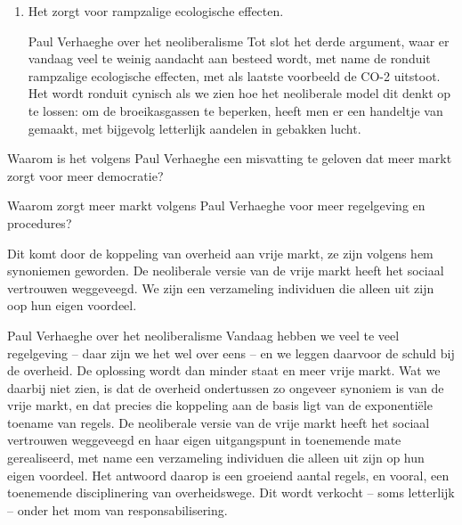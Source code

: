 \documentclass[main.tex]{subfiles}
\begin{document}
\begin{examenvraag}
\begin{antwoord}
\begin{enumerate}
		\item Het zorgt voor rampzalige ecologische effecten.
		\begin{citaat}{Paul Verhaeghe over het neoliberalisme}
		Tot slot het derde argument, waar er vandaag veel te weinig aandacht aan besteed wordt, met
name de ronduit rampzalige ecologische effecten, met als laatste voorbeeld de CO-2 uitstoot. Het
wordt ronduit cynisch als we zien hoe het neoliberale model dit denkt op te lossen: om de
broeikasgassen te beperken, heeft men er een handeltje van gemaakt, met bijgevolg letterlijk aandelen
in gebakken lucht.
		\end{citaat}
    \end{enumerate}
    \end{antwoord}
\end{examenvraag}


\begin{examenvraag}
    \begin{vraag}
        Waarom is het volgens Paul Verhaeghe een misvatting te geloven dat meer markt zorgt voor meer democratie?
    \end{vraag}

    \begin{antwoord}
    \end{antwoord}
\end{examenvraag}


\begin{examenvraag}

    \begin{vraag}
        Waarom zorgt meer markt volgens Paul Verhaeghe voor meer regelgeving en procedures?
    \end{vraag}

    \begin{antwoord}
    Dit komt door de koppeling van overheid aan vrije markt, ze zijn volgens hem 
    synoniemen geworden. De neoliberale versie van de vrije markt heeft het 
    sociaal vertrouwen weggeveegd. We zijn een verzameling individuen die alleen 
    uit zijn oop hun eigen voordeel.
    \end{antwoord}
    
    \begin{citaat}{Paul Verhaeghe over het neoliberalisme}
	Vandaag hebben we veel te veel regelgeving – daar zijn we het wel
	over eens – en we leggen daarvoor de schuld bij de overheid. De oplossing 
	wordt dan minder staat en meer vrije markt. Wat we daarbij niet zien, is dat 	
	de overheid ondertussen zo ongeveer synoniem is van de vrije markt, en dat 
	precies die koppeling aan de basis ligt van de exponentiële toename van
	regels. De neoliberale versie van de vrije markt heeft het sociaal vertrouwen 
	weggeveegd en haar eigen uitgangspunt in toenemende mate gerealiseerd, met 
	name een verzameling individuen die alleen uit zijn op hun eigen voordeel. Het 
	antwoord daarop is een groeiend aantal regels, en vooral, een
	toenemende disciplinering van overheidswege. Dit wordt verkocht – soms
	letterlijk – onder het mom van responsabilisering.
    \end{citaat}
\end{examenvraag}
\end{document}
